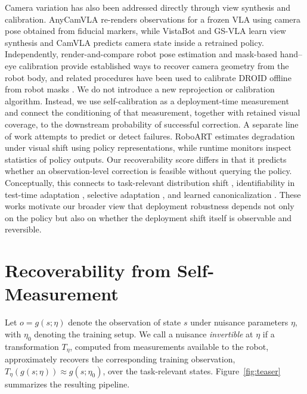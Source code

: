 \documentclass{article}
\begin{document}
Camera variation has also been addressed directly through view synthesis and calibration. AnyCamVLA
\citep{anycamvla} re-renders observations for a frozen VLA using camera pose obtained from fiducial markers, while
VistaBot \citep{vistabot} and GS-VLA \citep{gsvla} learn view synthesis and CamVLA \citep{fixedtofree} predicts camera
state inside a retrained policy. Independently, render-and-compare robot pose estimation
\citep{dream,robopose,ctrnet,gisr} and mask-based hand--eye calibration \citep{easyhec,easyhecpp} provide established
ways to recover camera geometry from the robot body, and related procedures have been used to calibrate DROID
\citep{droid} offline from robot masks \citep{caliball,poseddroid}. We do not introduce a new reprojection or calibration
algorithm. Instead, we use self-calibration as a deployment-time measurement and connect the conditioning of that
measurement, together with retained visual coverage, to the downstream probability of successful correction.
A separate line of work attempts to predict or detect failures. RoboART \citep{roboart} estimates degradation under
visual shift using policy representations, while runtime monitors
\citep{sentinel,faildetect,safevla,fiper,actprobe,triinfo} inspect statistics of policy outputs. Our recoverability score
differs in that it predicts whether an observation-level correction is feasible without querying the policy. Conceptually,
this connects to task-relevant distribution shift \citep{farid}, identifiability in test-time adaptation
\citep{ttaident}, selective adaptation \citep{selectivetta}, and learned canonicalization \citep{kaba}. These works
motivate our broader view that deployment robustness depends not only on the policy but also on whether the deployment
shift itself is observable and reversible.

\section{Recoverability from Self-Measurement}

\label{sec:method}

Let $o=g(s;\eta)$ denote the observation of state $s$ under nuisance parameters $\eta$, with $\eta_0$ denoting the
training setup. We call a nuisance \emph{invertible} at $\eta$ if a transformation $T_\eta$, computed from measurements
available to the robot, approximately recovers the corresponding training observation,
$T_\eta(g(s;\eta))\approx g(s;\eta_0)$, over the task-relevant states. Figure~\ref{fig:teaser} summarizes the
resulting pipeline.
\end{document}
